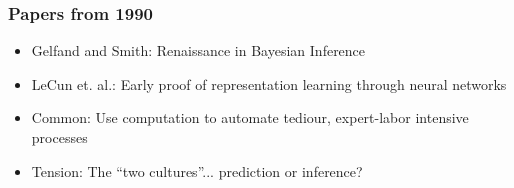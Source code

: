 \documentclass[10pt,mathserif]{beamer}
\begin{document}
\begin{frame}
  \frametitle{Papers from 1990}
  \begin{itemize}
  \item Gelfand and Smith: Renaissance in Bayesian Inference
  \item LeCun et. al.: Early proof of representation learning through neural networks
  \item Common: Use computation to automate tediour, expert-labor intensive processes
  \item Tension: The ``two cultures''... prediction or inference?
  \end{itemize}
  \begin{figure}
  \end{figure}
\end{frame}
\end{document}

